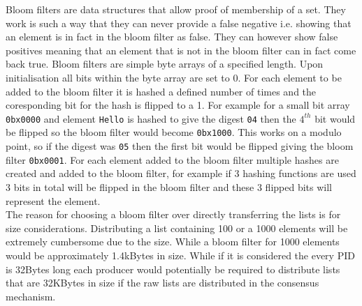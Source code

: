 Bloom filters are data structures that allow proof of membership of a set. They work is such a way that they can never provide a false negative i.e. showing that an element is in fact in the bloom filter as false. They can however show false positives meaning that an element that is not in the bloom filter can in fact come back true. Bloom filters are simple byte arrays of a specified length. Upon initialisation all bits within the byte array are set to 0. For each element to be added to the bloom filter it is hashed a defined number of times and the coresponding bit for the hash is flipped to a 1. For example for a small bit array \verb'0bx0000' and element \verb'Hello' is hashed to give the digest \verb'04' then the $4^{th}$ bit would be flipped so the bloom filter would become \verb'0bx1000'. This works on a modulo point, so if the digest was \verb'05' then the first bit would be flipped giving the bloom filter \verb'0bx0001'. For each element added to the bloom filter multiple hashes are created and added to the bloom filter, for example if 3 hashing functions are used 3 bits in total will be flipped in the bloom filter and these 3 flipped bits will represent the element. \\

The reason for choosing a bloom filter over directly transferring the lists is for size considerations. Distributing a list containing 100 or a 1000 elements will be extremely cumbersome due to the size. While a bloom filter for 1000 elements would be approximately 1.4kBytes in size. While if it is considered the every PID is 32Bytes long each producer would potentially be required to distribute lists that are 32KBytes in size if the raw lists are distributed in the consensus mechanism. 